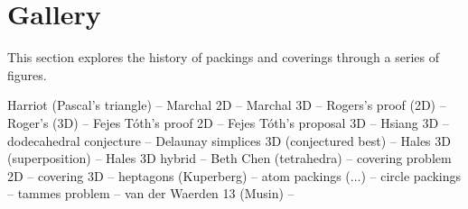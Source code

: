\section{Gallery}

This section explores the history of  packings and coverings through a series of figures.

Harriot (Pascal's triangle) -- 
Marchal 2D -- Marchal 3D --  Rogers's proof (2D) -- Roger's (3D) -- Fejes T\'oth's proof 2D --
Fejes T\'oth's proposal 3D -- Hsiang 3D -- dodecahedral conjecture --
Delaunay simplices 3D (conjectured best) -- Hales 3D (superposition) --
Hales 3D hybrid -- Beth Chen (tetrahedra) -- covering problem 2D --
covering 3D -- heptagons (Kuperberg) -- atom packings (...) -- circle packings --
tammes problem --
van der Waerden 13 (Musin) -- 



\clearpage






